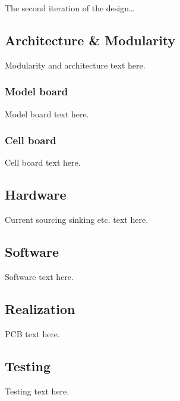 \IEEEPARstart
{T}{he} second iteration of the design\dots

\subsection{Architecture \& Modularity}
Modularity and architecture text here.
    \subsubsection{Model board}
    Model board text here.
    \subsubsection{Cell board}
    Cell board text here.   

\subsection{Hardware}
Current sourcing sinking etc. text here.
\subsection{Software}
Software text here.
\subsection{Realization}
PCB text here.
\subsection{Testing}
Testing text here.